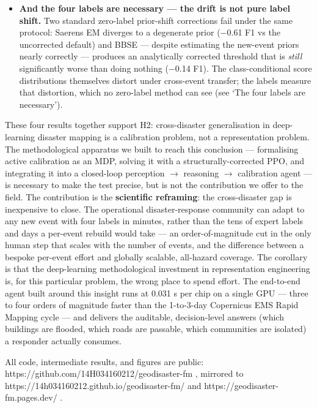 \begin{itemize}
  captured in four chips of pool labels.
\item
  \textbf{And the four labels are necessary --- the drift is not pure label
  shift.} Two standard zero-label prior-shift corrections fail under
  the same protocol: Saerens EM diverges to a degenerate prior
  ($-$0.61 F1 vs the uncorrected default) and BBSE --- despite estimating
  the new-event priors nearly correctly --- produces an analytically
  corrected threshold that is \emph{still} significantly worse than doing
  nothing ($-$0.14 F1). The class-conditional score distributions
  themselves distort under cross-event transfer; the labels measure
  that distortion, which no zero-label method can see (see `The four labels are necessary').
\end{itemize}

These four results together support H2: cross-disaster generalisation
in deep-learning disaster mapping is a calibration problem, not a
representation problem. The methodological apparatus we built to reach
this conclusion --- formalising active calibration as an MDP, solving it
with a structurally-corrected PPO, and integrating it into a closed-loop
perception $\rightarrow$ reasoning $\rightarrow$ calibration agent --- is necessary to make the
test precise, but is not the contribution we offer to the field. The
contribution is the \textbf{scientific reframing}: the cross-disaster gap is
inexpensive to close. The operational disaster-response community can
adapt to any new event with four labels in minutes, rather than the tens
of expert labels and days a per-event rebuild would take --- an
order-of-magnitude cut in the only human step that scales with the
number of events, and the difference between a bespoke per-event effort
and globally scalable, all-hazard coverage. The corollary is that the
deep-learning methodological investment in representation engineering
is, for this particular problem, the wrong place to spend effort. The
end-to-end agent built around this insight runs at 0.031 s per chip on a
single GPU --- three to four orders of magnitude faster than the 1-to-3-day
Copernicus EMS Rapid Mapping cycle --- and delivers the auditable,
decision-level answers (which buildings are flooded, which roads are
passable, which communities are isolated) a responder actually consumes.

All code, intermediate results, and figures are public:
https://github.com/14H034160212/geodisaster-fm , mirrored to
https://14h034160212.github.io/geodisaster-fm/ and
https://geodisaster-fm.pages.dev/ .

